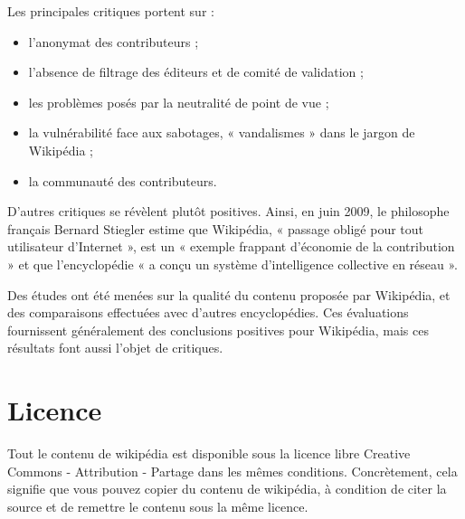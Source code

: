 \documentclass[12pt]{../fiche}
\begin{document}
Les principales critiques portent sur :
\begin{itemize}
    \item l'anonymat des contributeurs ;
    \item l'absence de filtrage des éditeurs et de comité de validation ;
    \item les problèmes posés par la neutralité de point de vue ;
    \item la vulnérabilité face aux sabotages, « vandalismes » dans le jargon de Wikipédia ;
    \item la communauté des contributeurs.
\end{itemize}

D'autres critiques se révèlent plutôt positives. Ainsi, en juin 2009, le
philosophe français Bernard Stiegler estime que Wikipédia, « passage obligé
pour tout utilisateur d'Internet », est un « exemple frappant d'économie de la
contribution » et que l'encyclopédie « a conçu un système d'intelligence
collective en réseau ».

Des études ont été menées sur la qualité du contenu proposée par Wikipédia, et
des comparaisons effectuées avec d'autres encyclopédies. Ces évaluations
fournissent généralement des conclusions positives pour Wikipédia, mais ces
résultats font aussi l'objet de critiques.

\vspace{-0.3cm}
\section*{Licence}
Tout le contenu de wikipédia est disponible sous la licence libre Creative
Commons - Attribution - Partage dans les mêmes conditions.
Concrètement, cela signifie que vous pouvez copier du contenu de wikipédia, à
condition de citer la source et de remettre le contenu sous la même licence.

\vspace{-0.3cm}
\end{document}
